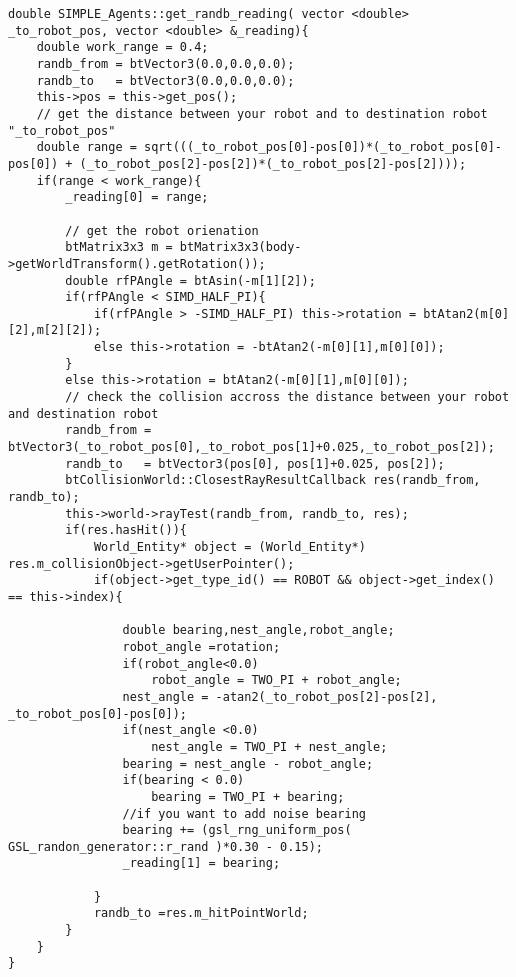 \begin{lstlisting}[caption = {Code of the Range and Bearing Function}]
double SIMPLE_Agents::get_randb_reading( vector <double> _to_robot_pos, vector <double> &_reading){
    double work_range = 0.4;
    randb_from = btVector3(0.0,0.0,0.0);
    randb_to   = btVector3(0.0,0.0,0.0);
    this->pos = this->get_pos();
    // get the distance between your robot and to destination robot "_to_robot_pos"
    double range = sqrt(((_to_robot_pos[0]-pos[0])*(_to_robot_pos[0]-pos[0]) + (_to_robot_pos[2]-pos[2])*(_to_robot_pos[2]-pos[2])));
    if(range < work_range){
        _reading[0] = range;

        // get the robot orienation
        btMatrix3x3 m = btMatrix3x3(body->getWorldTransform().getRotation());
        double rfPAngle = btAsin(-m[1][2]);
        if(rfPAngle < SIMD_HALF_PI){
            if(rfPAngle > -SIMD_HALF_PI) this->rotation = btAtan2(m[0][2],m[2][2]);
            else this->rotation = -btAtan2(-m[0][1],m[0][0]);
        }
        else this->rotation = btAtan2(-m[0][1],m[0][0]);
        // check the collision accross the distance between your robot and destination robot
        randb_from = btVector3(_to_robot_pos[0],_to_robot_pos[1]+0.025,_to_robot_pos[2]);
        randb_to   = btVector3(pos[0], pos[1]+0.025, pos[2]);
        btCollisionWorld::ClosestRayResultCallback res(randb_from, randb_to);
        this->world->rayTest(randb_from, randb_to, res);
        if(res.hasHit()){
            World_Entity* object = (World_Entity*) res.m_collisionObject->getUserPointer();
            if(object->get_type_id() == ROBOT && object->get_index() == this->index){

                double bearing,nest_angle,robot_angle;
                robot_angle =rotation;
                if(robot_angle<0.0)
                    robot_angle = TWO_PI + robot_angle;
                nest_angle = -atan2(_to_robot_pos[2]-pos[2], _to_robot_pos[0]-pos[0]);
                if(nest_angle <0.0)
                    nest_angle = TWO_PI + nest_angle;
                bearing = nest_angle - robot_angle;
                if(bearing < 0.0)
                    bearing = TWO_PI + bearing;
                //if you want to add noise bearing
                bearing += (gsl_rng_uniform_pos( GSL_randon_generator::r_rand )*0.30 - 0.15);
                _reading[1] = bearing;

            }
            randb_to =res.m_hitPointWorld;
        }
    }
}
\end{lstlisting}